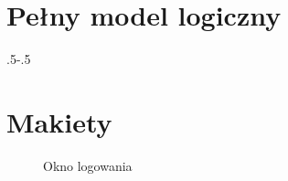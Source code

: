 \documentclass[a4paper,onecolumn,oneside,11pt,wide,floatssmall]{mwrep}
\theoremstyle{definition}
\theoremstyle{plain}%
\theoremstyle{remark}
\begin{document}
\chapter{Pełny model logiczny}
\label{dodatek-model-logiczny}

 {\pdfpagewidth
    \vspace*{1cm}
    \noindent\kern.5\pdfpagewidth{}\kern-.5\pdfpagewidth
     \par
     \vspace*{-5cm}
\clearpage
}

\chapter{Makiety}
\label{dodatek-makiety}

\begin{figure}[H]
  \begin{center}
  \end{center}
  \caption{Okno logowania}
  \label{fig:mockups-login}
\end{figure}
\end{document}
